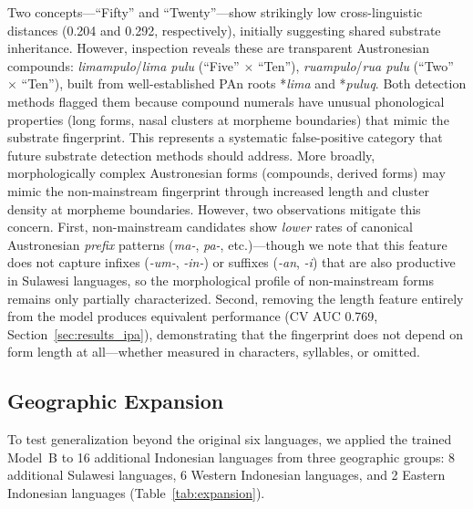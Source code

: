 \documentclass[12pt]{article}
\begin{document}
Two concepts---``Fifty'' and ``Twenty''---show strikingly low cross-linguistic distances (0.204 and 0.292, respectively), initially suggesting shared substrate inheritance.
However, inspection reveals these are transparent Austronesian compounds: \textit{limampulo}/\textit{lima pulu} (``Five'' $\times$ ``Ten''), \textit{ruampulo}/\textit{rua pulu} (``Two'' $\times$ ``Ten''), built from well-established PAn roots *\textit{lima} and *\textit{puluq}.
Both detection methods flagged them because compound numerals have unusual phonological properties (long forms, nasal clusters at morpheme boundaries) that mimic the substrate fingerprint.
This represents a systematic false-positive category that future substrate detection methods should address.
More broadly, morphologically complex Austronesian forms (compounds, derived forms) may mimic the non-mainstream fingerprint through increased length and cluster density at morpheme boundaries.
However, two observations mitigate this concern.
First, non-mainstream candidates show \textit{lower} rates of canonical Austronesian \textit{prefix} patterns (\textit{ma-}, \textit{pa-}, etc.)---though we note that this feature does not capture infixes (\textit{-um-}, \textit{-in-}) or suffixes (\textit{-an}, \textit{-i}) that are also productive in Sulawesi languages, so the morphological profile of non-mainstream forms remains only partially characterized.
Second, removing the length feature entirely from the model produces equivalent performance (CV AUC 0.769, Section~\ref{sec:results_ipa}), demonstrating that the fingerprint does not depend on form length at all---whether measured in characters, syllables, or omitted.

\subsection{Geographic Expansion}
\label{sec:results_expansion}

To test generalization beyond the original six languages, we applied the trained Model~B to 16 additional Indonesian languages from three geographic groups: 8 additional Sulawesi languages, 6 Western Indonesian languages, and 2 Eastern Indonesian languages (Table~\ref{tab:expansion}).
\end{document}
